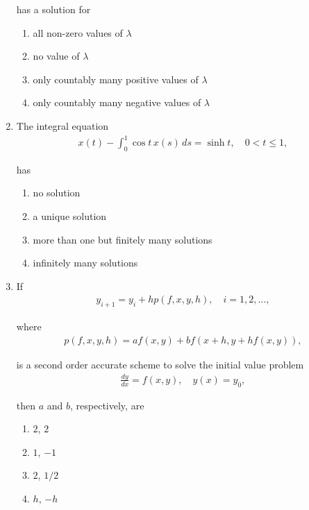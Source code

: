 \documentclass[journal]{IEEEtran}
\numberwithin{equation}{enumi}
\numberwithin{figure}{enumi}
\begin{document}
\begin{enumerate}
has a solution for
\hfill{}

\begin{enumerate}
    \item all non-zero values of $\lambda$
    \item no value of $\lambda$
    \item only countably many positive values of $\lambda$
    \item only countably many negative values of $\lambda$
\end{enumerate}


\item
The integral equation
\begin{align}
    x(t) - \int_0^1 \cos t \, x(s) \, ds = \sinh t, \quad 0 < t \leq 1,
\end{align}

has
\hfill{}

\begin{enumerate}
    \item no solution
    \item a unique solution
    \item more than one but finitely many solutions
    \item infinitely many solutions
\end{enumerate}


\item
If 
\begin{align}
    y_{i+1} = y_i + h p(f,x,y,h), \quad i = 1,2,\ldots,
\end{align}

where
\begin{align}
    p(f,x,y,h) = a f(x,y) + b f(x+h, y + h f(x,y)),
\end{align}

is a second order accurate scheme to solve the initial value problem
\begin{align}
    \frac{dy}{dx} = f(x,y), \quad y(x) = y_0,
\end{align}

then $a$ and $b$, respectively, are
\hfill{}
\begin{multicols}{4}
\begin{enumerate}
    \item $2$, $2$
    \item $1$, $-1$
    \item $2$, $1/2$
    \item $h$, $-h$
\end{enumerate}
\end{multicols}


\end{enumerate}
\end{document}
